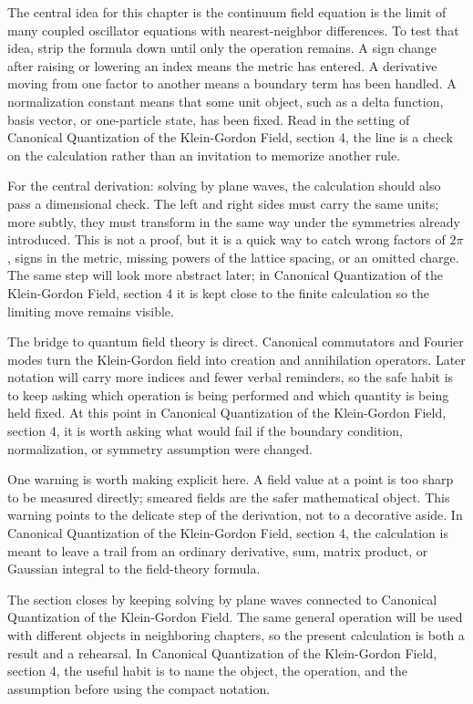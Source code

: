 The central idea for this chapter is the continuum field equation is the limit of many coupled oscillator equations with nearest-neighbor differences.  To test that idea, strip the formula down until only the operation remains.  A sign change after raising or lowering an index means the metric has entered.  A derivative moving from one factor to another means a boundary term has been handled.  A normalization constant means that some unit object, such as a delta function, basis vector, or one-particle state, has been fixed.  Read in the setting of Canonical Quantization of the Klein-Gordon Field, section 4, the line is a check on the calculation rather than an invitation to memorize another rule.

For the central derivation: solving by plane waves, the calculation should also pass a dimensional check.  The left and right sides must carry the same units; more subtly, they must transform in the same way under the symmetries already introduced.  This is not a proof, but it is a quick way to catch wrong factors of \(2\pi\), signs in the metric, missing powers of the lattice spacing, or an omitted charge.  The same step will look more abstract later; in Canonical Quantization of the Klein-Gordon Field, section 4 it is kept close to the finite calculation so the limiting move remains visible.

The bridge to quantum field theory is direct.  Canonical commutators and Fourier modes turn the Klein-Gordon field into creation and annihilation operators.  Later notation will carry more indices and fewer verbal reminders, so the safe habit is to keep asking which operation is being performed and which quantity is being held fixed.  At this point in Canonical Quantization of the Klein-Gordon Field, section 4, it is worth asking what would fail if the boundary condition, normalization, or symmetry assumption were changed.

One warning is worth making explicit here.  A field value at a point is too sharp to be measured directly; smeared fields are the safer mathematical object.  This warning points to the delicate step of the derivation, not to a decorative aside.  In Canonical Quantization of the Klein-Gordon Field, section 4, the calculation is meant to leave a trail from an ordinary derivative, sum, matrix product, or Gaussian integral to the field-theory formula.

The section closes by keeping solving by plane waves connected to Canonical Quantization of the Klein-Gordon Field.  The same general operation will be used with different objects in neighboring chapters, so the present calculation is both a result and a rehearsal.  In Canonical Quantization of the Klein-Gordon Field, section 4, the useful habit is to name the object, the operation, and the assumption before using the compact notation.



